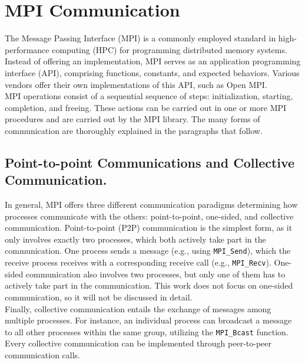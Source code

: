 \section{MPI Communication}
The Message Passing Interface (MPI)  is a commonly employed standard in high-performance computing (HPC) for programming distributed memory systems. 
Instead of offering an implementation, MPI serves as an application programming interface (API), comprising functions, constants, and expected behaviors. 
Various vendors offer their own implementations of this API, such as Open MPI.\\
MPI operations consist of a sequential sequence of steps: initialization, starting, completion, and freeing. 
These actions can be carried out in one or more MPI procedures and are carried out by the MPI library. The many forms of communication are thoroughly explained in the paragraphs that follow.\\

\subsection{Point-to-point Communications and Collective Communication.}
In general, MPI offers three different communication paradigms determining how processes communicate with the others: point-to-point, one-sided, and collective communication.
Point-to-point (P2P) communication is the simplest form, as it only involves exactly two processes, which both actively take part in the communication. 
One process sends a message (e.g., using \texttt{MPI\_Send}), which the receive process receives with a corresponding receive call (e.g., \texttt{MPI\_Recv}).
One-sided communication also involves two processes, but only one of them has to actively take part in the communication. This work does not focus on one-sided communication, so it will not be discussed in detail.\\
Finally, collective communication entails the exchange of messages among multiple processes. 
For instance, an individual process can broadcast a message to all other processes within the same group, utilizing the \texttt{MPI\_Bcast} function. 
Every collective communication can be implemented through peer-to-peer communication calls.

